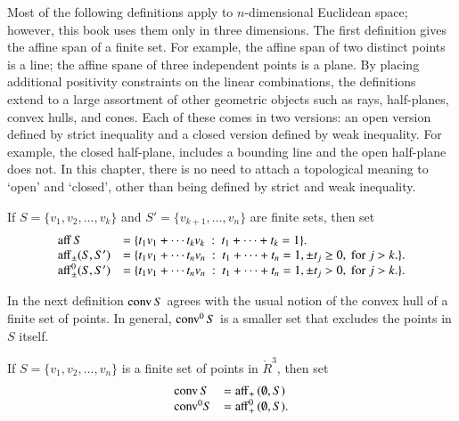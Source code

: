 Most of the following definitions apply to $n$-dimensional
Euclidean space; however, this book uses them only in
three dimensions.  The first definition 
gives the affine span of a finite set.  For example,
the affine span of two distinct points is a line;
the affine spane of three independent points is a plane.
By placing additional
positivity constraints on the linear combinations, the definitions
extend to a large assortment of other geometric objects
such as rays, half-planes, convex hulls, and cones.  
Each of these comes in two versions: an open version
defined by strict inequality and a closed version defined
by weak inequality.  For example, the closed half-plane,
includes a bounding line and the open half-plane does
not.  In this chapter, there is no need
to attach a topological meaning to `open' and `closed',
other than being defined by strict and weak inequality.


\begin{definition}[affine]\label{def:aff} 
 If $S = \{v_1,v_2,\ldots,v_k\}$ 
and $S'=\{v_{k+1},\ldots,v_n\}$ are  finite sets, then
set
	$$\begin{array}{lll}
      {\operatorname{aff}}\, S &= \{t_1 v_1 +\cdots t_k v_k \ :\ 
	t_1 +\cdots+t_k = 1\}.\\
        {\operatorname{aff}}_{\pm} (S,S') &= \{t_1 v_1 +\cdots t_n v_n \ :\ 
	t_1 +\cdots+t_n = 1, \pm t_j \ge 0, \text{ for } j>k.\}.\\
        {\operatorname{aff}}^0_{\pm} (S,S') &= \{t_1 v_1 +\cdots t_n v_n \ :\ 
	t_1 +\cdots+t_n = 1, \pm t_j > 0, \text{ for } j>k.\}.\\
		\end{array}
        $$
\end{definition}


In the next definition ${\operatorname{conv}}\,S$ agrees with the usual
notion of the convex hull of a finite set of points.
In general, ${\operatorname{conv}}^0\,S$ is a smaller set that excludes
the points in $S$ itself.  


\begin{definition}  If $S = \{v_1,v_2,\ldots,v_n\}$ is a finite set
of points in $\ring{R}^3$, then
set
	$$
        \begin{array}{lll}
          {\operatorname{conv}}\, S &= {\operatorname{aff}}_+\, (\emptyset,S)\\
	   {\operatorname{conv}}^0 S &= {\operatorname{aff}}^0_+\, (\emptyset,S).\\
           \end{array}
        $$
\end{definition}

